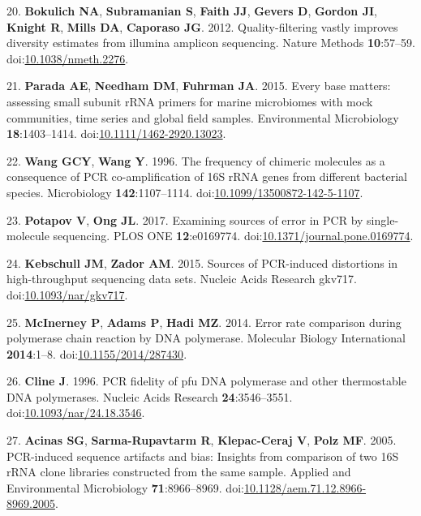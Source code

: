 \documentclass[11,]{article}
\begin{document}
20. \textbf{Bokulich NA}, \textbf{Subramanian S}, \textbf{Faith JJ},
\textbf{Gevers D}, \textbf{Gordon JI}, \textbf{Knight R}, \textbf{Mills
DA}, \textbf{Caporaso JG}. 2012. Quality-filtering vastly improves
diversity estimates from illumina amplicon sequencing. Nature Methods
\textbf{10}:57--59.
doi:\href{http://dx.doi.org/10.1038/nmeth.2276}{10.1038/nmeth.2276}.

21. \textbf{Parada AE}, \textbf{Needham DM}, \textbf{Fuhrman JA}. 2015.
Every base matters: assessing small subunit rRNA primers for marine
microbiomes with mock communities, time series and global field samples.
Environmental Microbiology \textbf{18}:1403--1414.
doi:\href{http://dx.doi.org/10.1111/1462-2920.13023}{10.1111/1462-2920.13023}.

22. \textbf{Wang GCY}, \textbf{Wang Y}. 1996. The frequency of chimeric
molecules as a consequence of PCR co-amplification of 16S rRNA genes
from different bacterial species. Microbiology \textbf{142}:1107--1114.
doi:\href{http://dx.doi.org/10.1099/13500872-142-5-1107}{10.1099/13500872-142-5-1107}.

23. \textbf{Potapov V}, \textbf{Ong JL}. 2017. Examining sources of
error in PCR by single-molecule sequencing. PLOS ONE
\textbf{12}:e0169774.
doi:\href{http://dx.doi.org/10.1371/journal.pone.0169774}{10.1371/journal.pone.0169774}.

24. \textbf{Kebschull JM}, \textbf{Zador AM}. 2015. Sources of
PCR-induced distortions in high-throughput sequencing data sets. Nucleic
Acids Research gkv717.
doi:\href{http://dx.doi.org/10.1093/nar/gkv717}{10.1093/nar/gkv717}.

25. \textbf{McInerney P}, \textbf{Adams P}, \textbf{Hadi MZ}. 2014.
Error rate comparison during polymerase chain reaction by DNA
polymerase. Molecular Biology International \textbf{2014}:1--8.
doi:\href{http://dx.doi.org/10.1155/2014/287430}{10.1155/2014/287430}.

26. \textbf{Cline J}. 1996. PCR fidelity of pfu DNA polymerase and other
thermostable DNA polymerases. Nucleic Acids Research
\textbf{24}:3546--3551.
doi:\href{http://dx.doi.org/10.1093/nar/24.18.3546}{10.1093/nar/24.18.3546}.

27. \textbf{Acinas SG}, \textbf{Sarma-Rupavtarm R}, \textbf{Klepac-Ceraj
V}, \textbf{Polz MF}. 2005. PCR-induced sequence artifacts and bias:
Insights from comparison of two 16S rRNA clone libraries constructed
from the same sample. Applied and Environmental Microbiology
\textbf{71}:8966--8969.
doi:\href{http://dx.doi.org/10.1128/aem.71.12.8966-8969.2005}{10.1128/aem.71.12.8966-8969.2005}.
\end{document}
